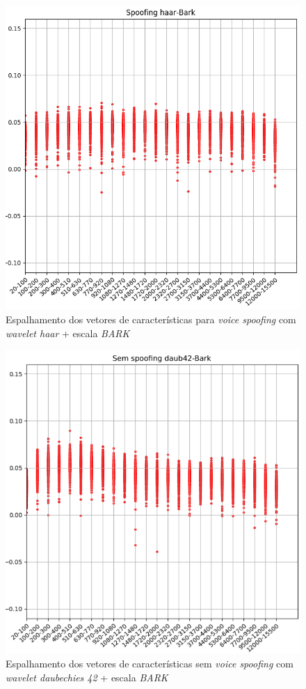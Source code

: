 		\begin{figure}[!h]
			\centering
			\includegraphics[width=.70\linewidth, height=.68\linewidth]{images/results/barkVersusMel/spoofingHaarBark}
			\caption{Espalhamento dos vetores de características para \textit{voice spoofing} com \textit{wavelet haar} + escala \textit{BARK} }
			\label{fig:spoofinghaarbark}
		\end{figure}
		\begin{figure}[!h]
			\centering
			\includegraphics[width=.70\linewidth, height=.68\linewidth]{images/results/barkVersusMel/liveDaub42Bark}
			\caption{Espalhamento dos vetores de características sem \textit{voice spoofing} com \textit{wavelet daubechies 42} + escala \textit{BARK} }
			\label{fig:livedaub42bark}
		\end{figure}
